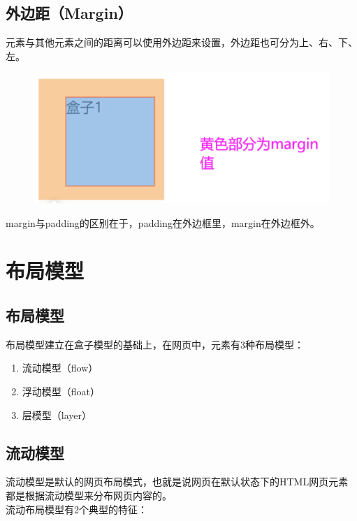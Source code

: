 \subsection{外边距（Margin）}

元素与其他元素之间的距离可以使用外边距来设置，外边距也可分为上、右、下、左。

\begin{figure}[H]
	\centering
	\includegraphics[scale=0.7]{img/C8/8-2/4.png}
\end{figure}

margin与padding的区别在于，padding在外边框里，margin在外边框外。

\newpage

\section{布局模型}

\subsection{布局模型}

布局模型建立在盒子模型的基础上，在网页中，元素有3种布局模型：

\begin{enumerate}
	\item 流动模型（flow）
	\item 浮动模型（float）
	\item 层模型（layer）
\end{enumerate}

\subsection{流动模型}

流动模型是默认的网页布局模式，也就是说网页在默认状态下的HTML网页元素都是根据流动模型来分布网页内容的。 \\

流动布局模型有2个典型的特征：

